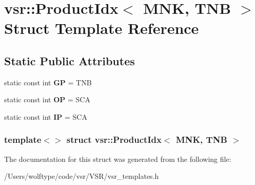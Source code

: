 \hypertarget{structvsr_1_1_product_idx_3_01_m_n_k_00_01_t_n_b_01_4}{\section{vsr\-:\-:Product\-Idx$<$ M\-N\-K, T\-N\-B $>$ Struct Template Reference}
\label{structvsr_1_1_product_idx_3_01_m_n_k_00_01_t_n_b_01_4}
}
\subsection*{Static Public Attributes}
\begin{DoxyCompactItemize}
\item 
\hypertarget{structvsr_1_1_product_idx_3_01_m_n_k_00_01_t_n_b_01_4_a45a181c28f0b4d7bab6bb7f33d80f52a}{static const int {\bfseries G\-P} = T\-N\-B}\label{structvsr_1_1_product_idx_3_01_m_n_k_00_01_t_n_b_01_4_a45a181c28f0b4d7bab6bb7f33d80f52a}

\item 
\hypertarget{structvsr_1_1_product_idx_3_01_m_n_k_00_01_t_n_b_01_4_adb69d2fdaec9bfff5b83ef9284322df6}{static const int {\bfseries O\-P} = S\-C\-A}\label{structvsr_1_1_product_idx_3_01_m_n_k_00_01_t_n_b_01_4_adb69d2fdaec9bfff5b83ef9284322df6}

\item 
\hypertarget{structvsr_1_1_product_idx_3_01_m_n_k_00_01_t_n_b_01_4_ad491f4f40b40287d61b062493b35d610}{static const int {\bfseries I\-P} = S\-C\-A}\label{structvsr_1_1_product_idx_3_01_m_n_k_00_01_t_n_b_01_4_ad491f4f40b40287d61b062493b35d610}

\end{DoxyCompactItemize}
\subsubsection*{template$<$$>$ struct vsr\-::\-Product\-Idx$<$ M\-N\-K, T\-N\-B $>$}



The documentation for this struct was generated from the following file\-:\begin{DoxyCompactItemize}
\item 
/\-Users/wolftype/code/vsr/\-V\-S\-R/vsr\-\_\-templates.\-h\end{DoxyCompactItemize}
